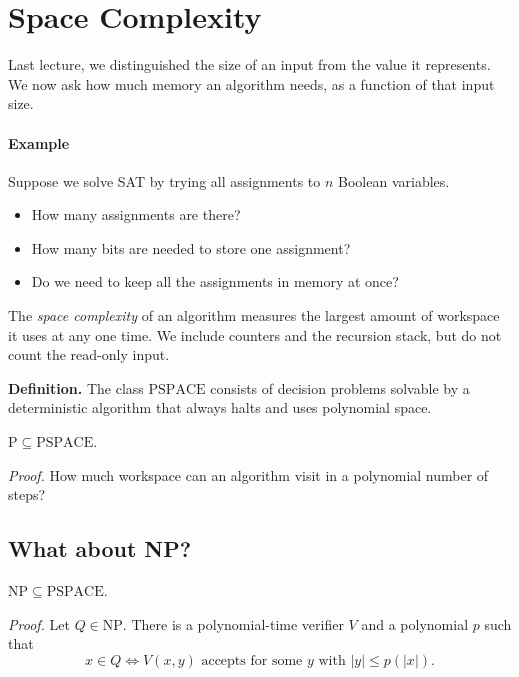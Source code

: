 \documentclass[11  pt]{article}
\begin{document}

\section{Space Complexity}
Last lecture, we distinguished the size of an input from the value it represents. We now ask how much memory an algorithm needs, as a function of that input size.

\paragraph{Example}
Suppose we solve SAT by trying all assignments to $n$ Boolean variables.
\begin{itemize}
    \item How many assignments are there? 
    \item How many bits are needed to store one assignment? 
    \item Do we need to keep all the assignments in memory at once?
\end{itemize}
\vs{1cm}

The \emph{space complexity} of an algorithm measures the largest amount of workspace it uses at any one time. We include counters and the recursion stack, but do not count the read-only input.

\textbf{Definition.} The class $\mathrm{PSPACE}$ consists of decision problems solvable by a deterministic algorithm that always halts and uses polynomial space.

\begin{theorem}
    $\mathrm{P}\subseteq\mathrm{PSPACE}$.
\end{theorem}
\textit{Proof.} How much workspace can an algorithm visit in a polynomial number of steps?
\vs{1.5cm}

\newpage
\subsection*{What about NP?}
\begin{theorem}
    $\mathrm{NP}\subseteq\mathrm{PSPACE}$.
\end{theorem}

\textit{Proof.} Let $Q\in\mathrm{NP}$. There is a polynomial-time verifier $V$ and a polynomial $p$ such that
\begin{equation*}
    x\in Q \iff V(x,y)\text{ accepts for some }y\text{ with }|y|\leq p(|x|).
\end{equation*}
\end{document}
